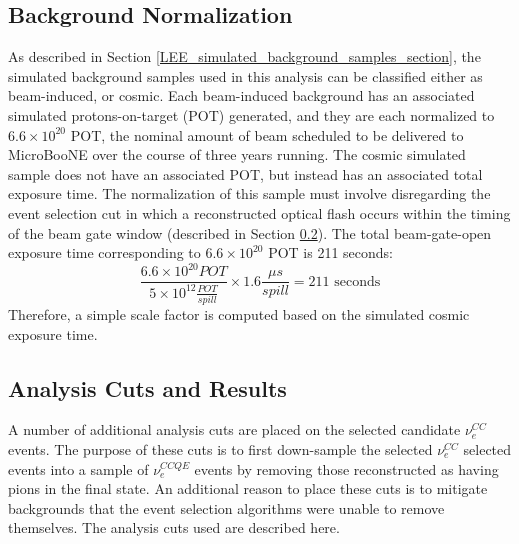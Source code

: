\subsection{Background Normalization}\label{LEE_background_normalization_section}
As described in Section \ref{LEE_simulated_background_samples_section}, the simulated background samples used in this analysis can be classified either as beam-induced, or cosmic. Each beam-induced background has an associated simulated protons-on-target (POT) generated, and they are each normalized to $6.6\times10^{20}$ POT, the nominal amount of beam scheduled to be delivered to MicroBooNE over the course of three years running. The cosmic simulated sample does not have an associated POT, but instead has an associated total exposure time. The normalization of this sample must involve disregarding the event selection cut in which a reconstructed optical flash occurs within the timing of the beam gate window (described in Section \ref{analysis_cut_descript_section}). The total beam-gate-open exposure time corresponding to $6.6\times10^{20}$ POT is 211 seconds:
\begin{equation}
\frac{6.6\times10^{20} POT}{5 \times 10^{12} \frac{POT}{spill}} \times 1.6\frac{\mu s}{spill} = 211 \text{ seconds}
\end{equation}
Therefore, a simple scale factor is computed based on the simulated cosmic exposure time.%


\subsection{Analysis Cuts and Results}\label{analysis_cut_descript_section}


A number of additional analysis cuts are placed on the selected candidate $\nu_e^{CC}$ events. The purpose of these cuts is to first down-sample the selected $\nu_e^{CC}$ selected events into a sample of $\nu_e^{CCQE}$ events by removing those reconstructed as having pions in the final state. An additional reason to place these cuts is to mitigate backgrounds that the event selection algorithms were unable to remove themselves. The analysis cuts used are described here.\\

